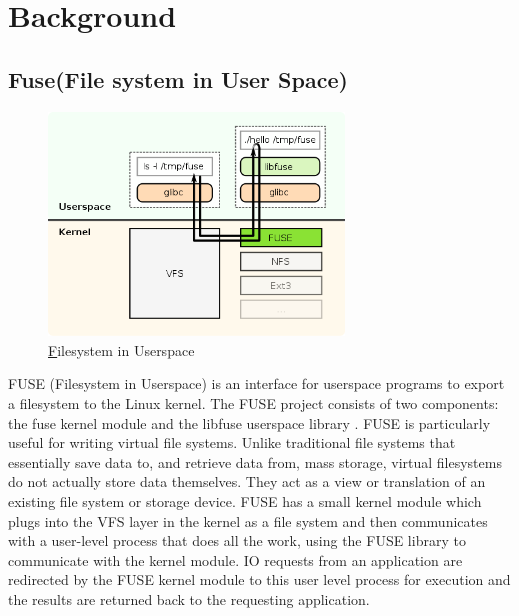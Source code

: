 %
%
\let\textcircled=\pgftextcircled
\chapter{Background}
\label{chap:background}

\section{Fuse(File system in User Space)}
\begin{figure}
   
    \includegraphics[width=0.7\textwidth ]{fig04/fuse}
    \caption{\href{https://en.wikipedia.org/wiki/Filesystem\_in\_Userspace}Filesystem in Userspace} \label{Filesystem in Userspace}
  \end{figure}
FUSE (Filesystem in Userspace) is an interface for userspace programs to export a filesystem to the Linux kernel. The FUSE project consists of two components: the fuse kernel module  and the libfuse userspace library . FUSE is particularly useful for writing virtual file systems. Unlike traditional file systems that essentially save data to, and retrieve data from, mass storage, virtual filesystems do not actually store data themselves. They act as a view or translation of an existing file system or storage device. FUSE has a small kernel module  which plugs into the VFS layer in the kernel as a file system and then communicates with a user-level process that does all the work, using the FUSE library to communicate with the kernel module. IO requests from an application are redirected by the FUSE kernel module to this user level process for execution and the results are returned back to the requesting application.
\linebreak


